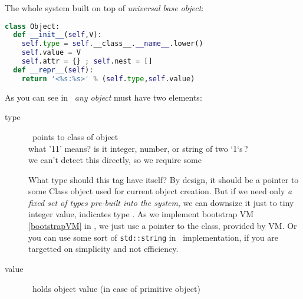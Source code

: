 \label{Object}\secdown

The whole system built on top of \emph{universal base object}: 

\begin{lstlisting}[language=Python]
class Object:
  def __init__(self,V):
    self.type = self.__class__.__name__.lower()
    self.value = V
    self.attr = {} ; self.nest = []
  def __repr__(self):
    return '<%s:%s>' % (self.type,self.value)
\end{lstlisting}

\noindent
As you can see in \cite{budd}\ \emph{any object} must have two elements:
\begin{description}%
\item[type]\ points to class of object\\
what '11' means? is it integer, number, or string of two `1`s\,?\\
we can't detect this directly, so we require some 

What type should this tag have itself? By design, it should be a pointer to some
Class object used for current object creation. But if we need only \emph{a fixed
set of types pre-built into the system}, we can downsize it just to tiny integer
value, indicates type \cite{STFPGA}. As we implement bootstrap VM
\ref{bootstrapVM} in \py, we just use a pointer to the class, provided by \py
VM. Or you can use some sort of \verb|std::string| in \cpp\ implementation, if
you are targetted on simplicity and not efficiency.

\item[value]\ holds object value (in case of primitive object)
\end{description}

\secup